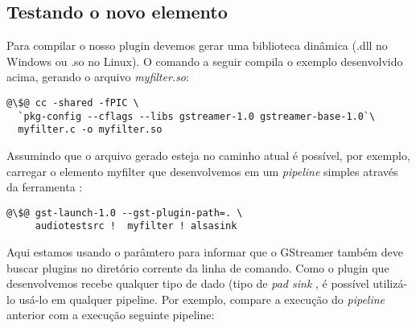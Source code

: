 

\subsection*{Testando o novo elemento}
Para compilar o nosso plugin devemos gerar uma biblioteca dinâmica (.dll no
Windows ou .so no Linux).  O comando a seguir compila o exemplo desenvolvido
acima, gerando o arquivo \emph{myfilter.so}:

\begin{lstlisting}[style=command]
@\$@ cc -shared -fPIC \
  `pkg-config --cflags --libs gstreamer-1.0 gstreamer-base-1.0`\
  myfilter.c -o myfilter.so
\end{lstlisting}

Assumindo que o arquivo gerado  esteja no caminho atual é
possível, por exemplo, carregar o elemento myfilter que desenvolvemos em um
\emph{pipeline} simples através da ferramenta \C{gst-launch}:

\begin{lstlisting}[style=command]
@\$@ gst-launch-1.0 --gst-plugin-path=. \
     audiotestsrc !  myfilter ! alsasink
\end{lstlisting}

Aqui estamos usando o parâmtero  para informar que o
GStreamer também deve buscar plugins no diretório corrente da linha de comando.
Como o plugin que desenvolvemos recebe qualquer tipo de dado (tipo de \emph{pad
sink} \C{ANY}, é possível utilizá-lo usá-lo em qualquer pipeline.  Por exemplo,
compare a execução do \emph{pipeline} anterior com a execução seguinte
pipeline:


